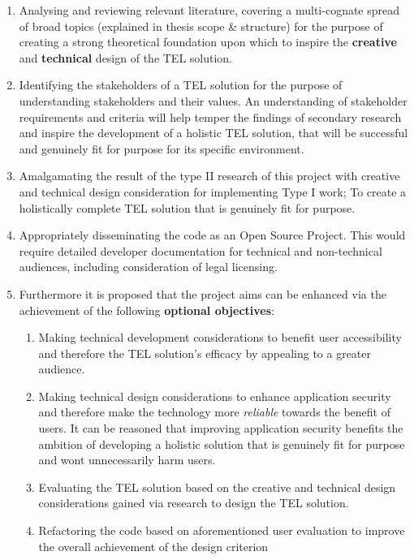 \begin{enumerate}

    \item Analysing and reviewing relevant literature, covering a multi-cognate spread of broad topics (explained in thesis scope \& structure) for the purpose of creating a strong theoretical foundation upon which to inspire the \textbf{creative} and \textbf{technical} design of the TEL solution. 
    
    \item Identifying the stakeholders of a TEL solution for the purpose of understanding stakeholders and their values. An understanding of stakeholder requirements and criteria will help temper the findings of secondary research and inspire the development of a holistic TEL solution, that will be successful and genuinely fit for purpose for its specific environment.
        
    \item Amalgamating the result of the type II research of this project with creative and technical design consideration for implementing Type I work; To create a holistically complete  TEL solution that is genuinely fit for purpose.
    
    \item Appropriately disseminating the code as an Open Source Project. This would require detailed developer documentation for technical and non-technical audiences, including consideration of legal licensing.
    
    \item Furthermore it is proposed that the project aims can be enhanced via the achievement of the following \textbf{optional objectives}:
    \begin{enumerate}
    \item Making technical development considerations to benefit user accessibility and therefore the TEL solution's efficacy by appealing to a greater audience.
    \item Making technical design considerations to enhance application security and therefore make the technology more \textit{reliable} towards the benefit of users. It can be reasoned that improving application security benefits the ambition of developing a holistic solution that is genuinely fit for purpose and wont unnecessarily harm users.
    \item Evaluating the TEL solution based on the creative and technical design considerations gained via research to design the TEL solution.
    \item Refactoring the code based on aforementioned user evaluation to improve the overall achievement of the design criterion
    \end{enumerate}
\end{enumerate}



